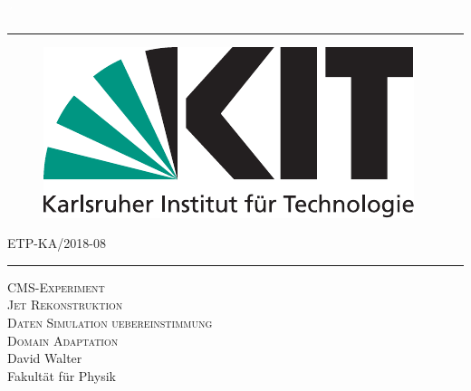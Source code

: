 \begin{titlepage}
  \begin{addmargin}[1.5cm]{0cm}
    \thispagestyle{empty}
    \vspace{-1cm}
    \begin{center}
                \textcolor{white}{´}\vspace{-3.5cm}
                  \rule{\linewidth}{0.75pt}
                    \vspace{-0.15cm}


\begin{figure}[htbp]
  \centering
  \hspace{26pt}
  \includegraphics[scale=0.5]{LogoKit}
\end{figure}

      \vspace{-0.45cm}
\hspace{9cm}ETP-KA/2018-08
\rule{\linewidth}{0.75pt}

\vspace{0.8cm}

  \Large{\textsc{ CMS-Experiment\\Jet Rekonstruktion \\Daten Simulation uebereinstimmung\\ Domain Adaptation}}\\%
\vspace{0.9cm}
\Large{David Walter}\\
\vspace{0.9cm}
\vspace{1cm}
\large{Fakult\"at f\"ur Physik\\
  
}
\end{center}
\end{addmargin}
\end{titlepage}
